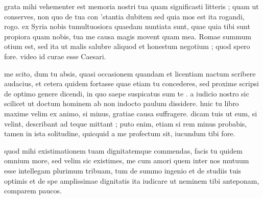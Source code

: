 


 grata mihi vehementer est memoria nostri tua quam significasti litteris ; quam ut conserves, non quo de tua con 'stantia dubitem sed quia mos est ita rogandi, rogo. ex Syria nobis tumultuosiora quaedam nuntiata sunt, quae quia tibi sunt propiora quam nobis, tua me causa magis movent quam mea. Romae summum otium est, sed ita ut malis salubre aliquod et honestum negotium ; quod spero fore. video id curae esse Caesari.

 me scito, dum tu absis, quasi occasionem quandam et licentiam nactum scribere audacius, et cetera quidem fortasse quae etiam tu concederes, sed proxime scripsi de optimo genere dicendi, in quo saepe suspicatus sum te . a iudicio nostro sic scilicet ut doctum hominem ab non indocto paulum dissidere. huic tu libro maxime velim ex animo, si minus, gratiae causa suffragere. dicam tuis ut eum, si velint, describant ad teque mittant ; puto enim, etiam si rem minus probabis, tamen in ista solitudine, quicquid a me profectum sit, iucundum tibi fore.

 quod mihi existimationem tuam dignitatemque commendas, facis tu quidem omnium more, sed velim sic existimes, me cum amori quem inter nos mutuum esse intellegam plurimum tribuam, tum de summo ingenio et de studiis tuis optimis et de spe amplissimae dignitatis ita iudicare ut neminem tibi anteponam, comparem paucos.
